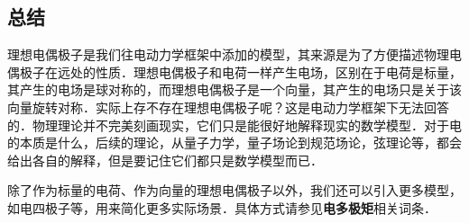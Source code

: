 \subsection{总结}

理想电偶极子是我们往电动力学框架中添加的模型，其来源是为了方便描述物理电偶极子在远处的性质．理想电偶极子和电荷一样产生电场，区别在于电荷是标量，其产生的电场是球对称的，而理想电偶极子是一个向量，其产生的电场只是关于该向量旋转对称．实际上存不存在理想电偶极子呢？这是电动力学框架下无法回答的．物理理论并不完美刻画现实，它们只是能很好地解释现实的数学模型．对于电的本质是什么，后续的理论，从量子力学，量子场论到规范场论，弦理论等，都会给出各自的解释，但是要记住它们都只是数学模型而已．

除了作为标量的电荷、作为向量的理想电偶极子以外，我们还可以引入更多模型，如电四极子等，用来简化更多实际场景．具体方式请参见\textbf{电多极矩}相关词条．

